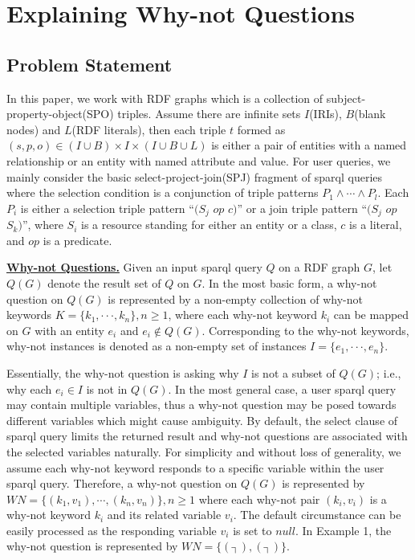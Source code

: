 \documentclass{article}
\begin{document}





\section{Explaining Why-not Questions}

\subsection{Problem Statement}

In this paper, we work with RDF graphs which is a collection of subject-property-object(SPO) triples.
Assume there are infinite sets $I$(IRIs), $B$(blank nodes) and $L$(RDF literals), then each triple $t$ formed
as $(s,p,o) \in (I \cup B) \times I \times (I \cup B \cup L)$ is either a pair of entities with a named relationship or an entity with named attribute and value.
For user queries, we mainly consider the basic select-project-join(SPJ) fragment of sparql queries
where the selection condition is a conjunction of triple patterns $P_1 \wedge \cdots \wedge P_l$.
Each $P_i$ is either a selection triple pattern “$(S_j$ $op$ $c)$” or a join triple pattern “$(S_j$ $op$ $S_k)$”,
where $S_i$ is a resource standing for either an entity or a class, $c$ is a literal, and $op$ is a predicate.

\textbf{\underline{Why-not Questions.}} Given an input sparql query $Q$ on a RDF graph $G$, let $Q(G)$ denote the result set of $Q$ on $G$. In the most basic form, a why-not question on $Q(G)$ is represented by a non-empty collection of why-not keywords $K=\{k_1,··· ,k_n \},n \geq 1$, where each why-not keyword $k_i$ can be mapped on $G$ with an entity $e_i$ and $e_i \notin Q(G)$. Corresponding to the why-not keywords, why-not instances is denoted as a non-empty set of instances $I=\{e_1, ··· , e_n\}$.

Essentially, the why-not question is asking why $I$ is not a subset of $Q(G)$; i.e., why each $e_i \in I$ is not in $Q(G)$. In the most general case, a user sparql query may contain multiple variables, thus a why-not question may be posed towards different variables which might cause ambiguity. By default, the select clause of sparql query limits the returned result and why-not questions are associated with the selected variables naturally. For simplicity and without loss of generality, we assume each why-not keyword responds to a specific variable within the user sparql query. Therefore, a why-not question on $Q(G)$ is represented by $WN=\{(k_1,v_1 ), \cdots ,(k_n,v_n)\},n \geq 1$ where each why-not pair $(k_i,v_i)$ is a why-not keyword $k_i$ and its related variable $v_i$. The default circumstance can be easily processed as the responding variable $v_i$ is set to $null$. In Example 1, the why-not question is represented by $WN=\{(┤),(┤)\}$.
\end{document}
